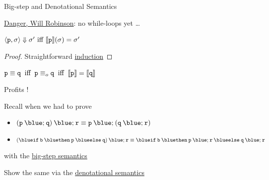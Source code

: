 \documentclass{beamer}
\begin{document}
\begin{frame}{Big-step and Denotational Semantics}

        \alert{\underline{Danger, Will Robinson}}: no while-loops yet \dots

        \medskip
        \begin{theorem}
                $\langle \mathtt{p}, \sigma \rangle \Downarrow \sigma' \text{ iff }
                \llbracket \mathtt{p} \rrbracket(\sigma) = \sigma'$
        \end{theorem}

        \begin{proof}
                Straightforward \alert{\underline{induction}}
        \end{proof}

        \bigskip
        \begin{corollary}
                $\mathtt{p} \equiv \mathtt{q} \> \text{ iff } \>
                \mathtt{p} \equiv_o \mathtt{q} \> \text{ iff } \>
                \llbracket \mathtt{p} \rrbracket = \llbracket \mathtt{q} \rrbracket$
        \end{corollary}
\end{frame}

\begin{frame}{Profits !}

        Recall when we had to prove
        \begin{itemize}
                \item $\mathtt{(p \> {\blue ;} \> q) \> {\blue ;} \> r} \equiv
                        \mathtt{p \> {\blue ;} \> (q \> {\blue ;} \> r)}$
                \item $\mathtt{({\blue if} \> b \> {\blue then} \> p \> {\blue else} \> q) 
                      \> {\blue ;} \> \prog{r}} \equiv 
                      \mathtt{{\blue if} \> b \> {\blue then} \> p \> {\blue ;} \> r \> 
                      {\blue else} \> q \> {\blue ;} \> r}$ 
        \end{itemize}
        with the \alert{\underline{big-step semantics}}

        \bigskip
        Show the same via the \alert{\underline{denotational semantics}}
\end{frame}
\end{document}
